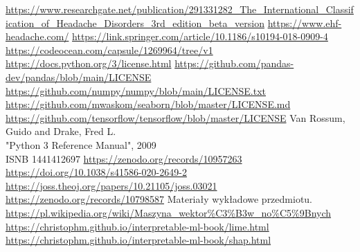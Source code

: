 \listoffigures

\begin{thebibliography}{10}
     \url{https://www.researchgate.net/publication/291331282_The_International_Classification_of_Headache_Disorders_3rd_edition_beta_version}
     \url{https://www.ehf-headache.com/}
     \url{https://link.springer.com/article/10.1186/s10194-018-0909-4}
     \url{https://codeocean.com/capsule/1269964/tree/v1}
     \url{https://docs.python.org/3/license.html}
     \url{https://github.com/pandas-dev/pandas/blob/main/LICENSE}
     \url{https://github.com/numpy/numpy/blob/main/LICENSE.txt}
     \url{https://github.com/mwaskom/seaborn/blob/master/LICENSE.md}
     \url{https://github.com/tensorflow/tensorflow/blob/master/LICENSE}
     Van Rossum, Guido and Drake, Fred L.\\
    "Python 3 Reference Manual", 2009\\
    ISNB 1441412697
     \url{https://zenodo.org/records/10957263}
     \url{https://doi.org/10.1038/s41586-020-2649-2}
     \url{https://joss.theoj.org/papers/10.21105/joss.03021}
     \url{https://zenodo.org/records/10798587}
     Materiały wykładowe przedmiotu.
     \url{https://pl.wikipedia.org/wiki/Maszyna_wektor%C3%B3w_no%C5%9Bnych}
     \url{https://christophm.github.io/interpretable-ml-book/lime.html}
     \url{https://christophm.github.io/interpretable-ml-book/shap.html}
\end{thebibliography}